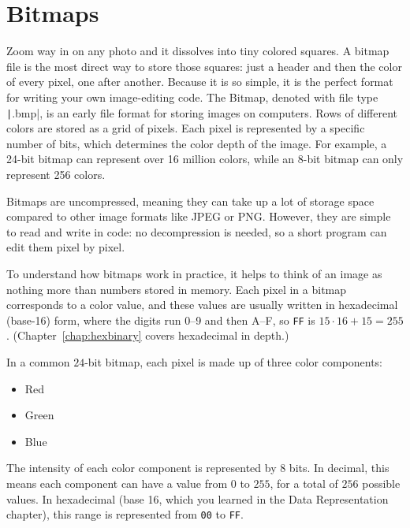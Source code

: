 \chapter{Bitmaps}\label{chap:bitmaps}
Zoom way in on any photo and it dissolves into tiny colored squares. A
bitmap file is the most direct way to store those squares: just a header
and then the color of every pixel, one after another. Because it is so
simple, it is the perfect format for writing your own image-editing code. The Bitmap, denoted with file type \texttt|.bmp|, is an early file format for storing images on computers. Rows of different colors are stored as a grid of pixels. Each pixel is represented by a specific number of bits, which determines the color depth of the image. For example, a 24-bit bitmap can represent over 16 million colors, while an 8-bit bitmap can only represent 256 colors. 

Bitmaps are uncompressed, meaning they can take up a lot of storage space compared to other image formats like JPEG or PNG. However, they are simple to read and write in code: no decompression is needed, so a short program can edit them pixel by pixel.

To understand how bitmaps work in practice, it helps to think of an image as nothing more than numbers stored in memory. Each pixel in a bitmap corresponds to a color value, and these values are usually written in hexadecimal (base-16) form, where the digits run 0--9 and then A--F, so \texttt{FF} is $15 \cdot 16 + 15 = 255$. (Chapter~\ref{chap:hexbinary} covers hexadecimal in depth.)

In a common $24$-bit bitmap, each pixel is made up of three color components:
\begin{itemize}
\item Red
\item Green
\item Blue
\end{itemize}

The intensity of each color component is represented by $8$ bits. In decimal, this means each component can have a value from $0$ to $255$, for a total of $256$ possible values. In hexadecimal (base 16, which you learned in the Data Representation chapter), this range is represented from \texttt{00} to \texttt{FF}.

